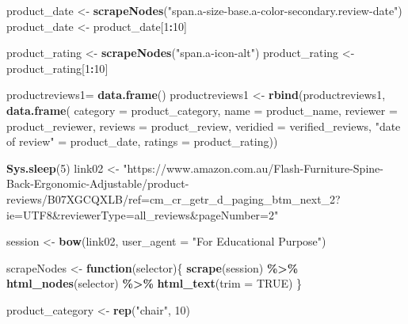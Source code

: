 \documentclass[
]{article}
\newenvironment{Shaded}{\begin{snugshade}}{\end{snugshade}}
\newcommand{\AttributeTok}[1]{\textcolor[rgb]{0.13,0.29,0.53}{#1}}
\newcommand{\ConstantTok}[1]{\textcolor[rgb]{0.56,0.35,0.01}{#1}}
\newcommand{\ControlFlowTok}[1]{\textcolor[rgb]{0.13,0.29,0.53}{\textbf{#1}}}
\newcommand{\DecValTok}[1]{\textcolor[rgb]{0.00,0.00,0.81}{#1}}
\newcommand{\FunctionTok}[1]{\textcolor[rgb]{0.13,0.29,0.53}{\textbf{#1}}}
\newcommand{\NormalTok}[1]{#1}
\newcommand{\OtherTok}[1]{\textcolor[rgb]{0.56,0.35,0.01}{#1}}
\newcommand{\SpecialCharTok}[1]{\textcolor[rgb]{0.81,0.36,0.00}{\textbf{#1}}}
\newcommand{\StringTok}[1]{\textcolor[rgb]{0.31,0.60,0.02}{#1}}
\begin{document}
\begin{Shaded}
\begin{Highlighting}[]
\NormalTok{  product\_date }\OtherTok{\textless{}{-}} \FunctionTok{scrapeNodes}\NormalTok{(}\StringTok{"span.a{-}size{-}base.a{-}color{-}secondary.review{-}date"}\NormalTok{)}
\NormalTok{  product\_date }\OtherTok{\textless{}{-}}\NormalTok{ product\_date[}\DecValTok{1}\SpecialCharTok{:}\DecValTok{10}\NormalTok{]}
  
\NormalTok{  product\_rating }\OtherTok{\textless{}{-}} \FunctionTok{scrapeNodes}\NormalTok{(}\StringTok{"span.a{-}icon{-}alt"}\NormalTok{)}
\NormalTok{  product\_rating }\OtherTok{\textless{}{-}}\NormalTok{ product\_rating[}\DecValTok{1}\SpecialCharTok{:}\DecValTok{10}\NormalTok{]}
  
\NormalTok{  productreviews1}\OtherTok{=} \FunctionTok{data.frame}\NormalTok{()}
\NormalTok{  productreviews1 }\OtherTok{\textless{}{-}} \FunctionTok{rbind}\NormalTok{(productreviews1, }\FunctionTok{data.frame}\NormalTok{(}
                      \AttributeTok{category =}\NormalTok{ product\_category,}
                      \AttributeTok{name =}\NormalTok{ product\_name,}
                      \AttributeTok{reviewer =}\NormalTok{ product\_reviewer,}
                      \AttributeTok{reviews =}\NormalTok{ product\_review,}
                      \AttributeTok{veridied =}\NormalTok{ verified\_reviews,}
                      \StringTok{"date of review"} \OtherTok{=}\NormalTok{ product\_date,}
                      \AttributeTok{ratings =}\NormalTok{ product\_rating))}

  
 \FunctionTok{Sys.sleep}\NormalTok{(}\DecValTok{5}\NormalTok{)}
\NormalTok{link02 }\OtherTok{\textless{}{-}} \StringTok{"https://www.amazon.com.au/Flash{-}Furniture{-}Spine{-}Back{-}Ergonomic{-}Adjustable/product{-}reviews/B07XGCQXLB/ref=cm\_cr\_getr\_d\_paging\_btm\_next\_2?ie=UTF8\&reviewerType=all\_reviews\&pageNumber=2"}


\NormalTok{  session }\OtherTok{\textless{}{-}} \FunctionTok{bow}\NormalTok{(link02,}
               \AttributeTok{user\_agent =} \StringTok{"For Educational Purpose"}\NormalTok{)}

\NormalTok{  scrapeNodes }\OtherTok{\textless{}{-}} \ControlFlowTok{function}\NormalTok{(selector)\{}
    \FunctionTok{scrape}\NormalTok{(session) }\SpecialCharTok{\%\textgreater{}\%}
      \FunctionTok{html\_nodes}\NormalTok{(selector) }\SpecialCharTok{\%\textgreater{}\%}
      \FunctionTok{html\_text}\NormalTok{(}\AttributeTok{trim =} \ConstantTok{TRUE}\NormalTok{)}
\NormalTok{  \}}

\NormalTok{  product\_category }\OtherTok{\textless{}{-}} \FunctionTok{rep}\NormalTok{(}\StringTok{"chair"}\NormalTok{, }\DecValTok{10}\NormalTok{)}


\end{Highlighting}
\end{Shaded}
\end{document}
